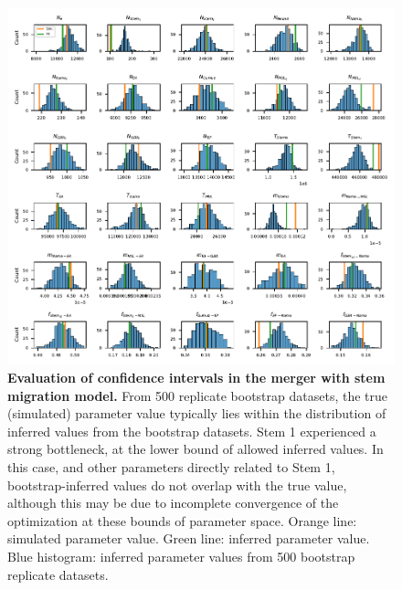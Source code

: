 \documentclass[]{article}
\begin{document}
\begin{figure}[ht]
    \centering
    \includegraphics{figures/supp-simulated-merger_with_stem_migration-bootstrap-fits.pdf}
    \caption{
        \textbf{Evaluation of confidence intervals in the merger with stem
        migration model.} From 500 replicate bootstrap datasets, the true
        (simulated) parameter value typically lies within the distribution of
        inferred values from the bootstrap datasets. Stem 1 experienced a
        strong bottleneck, at the lower bound of allowed inferred values. In
        this case, and other parameters directly related to Stem 1,
        bootstrap-inferred values do not overlap with the true value, although
        this may be due to incomplete convergence of the optimization at these
        bounds of parameter space. Orange line: simulated parameter value.
        Green line: inferred parameter value. Blue histogram: inferred
        parameter values from 500 bootstrap replicate datasets.
    }
    \label{fig:supp-sim-BS-merger-with-stem-migration}
\end{figure}
\end{document}

